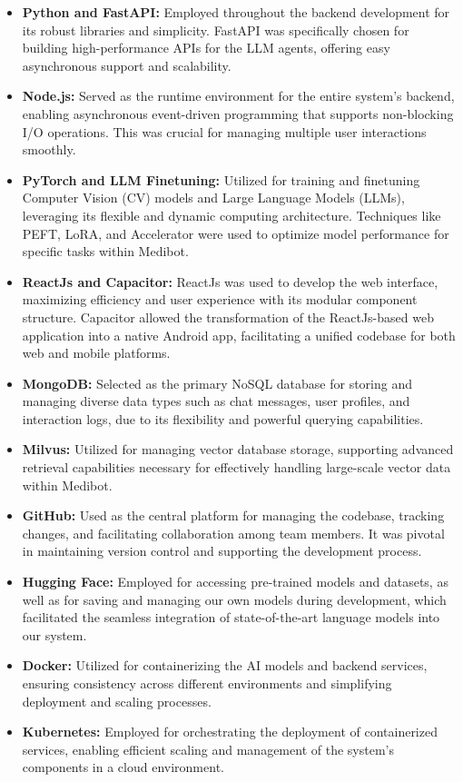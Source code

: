 \begin{itemize}
    \item \textbf{Python and FastAPI:} Employed throughout the backend development for its robust libraries and simplicity. FastAPI was specifically chosen for building high-performance APIs for the LLM agents, offering easy asynchronous support and scalability.

    \item \textbf{Node.js:} Served as the runtime environment for the entire system's backend, enabling asynchronous event-driven programming that supports non-blocking I/O operations. This was crucial for managing multiple user interactions smoothly.

    \item \textbf{PyTorch and LLM Finetuning:} Utilized for training and finetuning Computer Vision (CV) models and Large Language Models (LLMs), leveraging its flexible and dynamic computing architecture. Techniques like PEFT, LoRA, and Accelerator were used to optimize model performance for specific tasks within Medibot.

    \item \textbf{ReactJs and Capacitor:} ReactJs was used to develop the web interface, maximizing efficiency and user experience with its modular component structure. Capacitor allowed the transformation of the ReactJs-based web application into a native Android app, facilitating a unified codebase for both web and mobile platforms.

    \item \textbf{MongoDB:} Selected as the primary NoSQL database for storing and managing diverse data types such as chat messages, user profiles, and interaction logs, due to its flexibility and powerful querying capabilities.

    \item \textbf{Milvus:} Utilized for managing vector database storage, supporting advanced retrieval capabilities necessary for effectively handling large-scale vector data within Medibot.

    \item \textbf{GitHub:} Used as the central platform for managing the codebase, tracking changes, and facilitating collaboration among team members. It was pivotal in maintaining version control and supporting the development process.

    \item \textbf{Hugging Face:} Employed for accessing pre-trained models and datasets, as well as for saving and managing our own models during development, which facilitated the seamless integration of state-of-the-art language models into our system.

    \item \textbf{Docker:} Utilized for containerizing the AI models and backend services, ensuring consistency across different environments and simplifying deployment and scaling processes.
    \item \textbf{Kubernetes:} Employed for orchestrating the deployment of containerized services, enabling efficient scaling and management of the system's components in a cloud environment.
    
\end{itemize}

